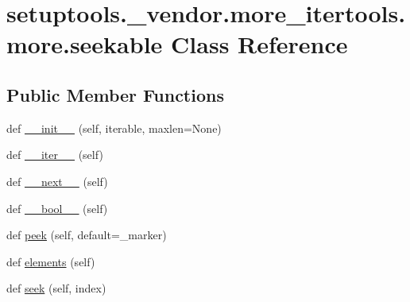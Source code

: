 \hypertarget{classsetuptools_1_1__vendor_1_1more__itertools_1_1more_1_1seekable}{}\section{setuptools.\+\_\+vendor.\+more\+\_\+itertools.\+more.\+seekable Class Reference}
\label{classsetuptools_1_1__vendor_1_1more__itertools_1_1more_1_1seekable}
\subsection*{Public Member Functions}
\begin{DoxyCompactItemize}
\item 
def \hyperlink{classsetuptools_1_1__vendor_1_1more__itertools_1_1more_1_1seekable_abe017ef9bd88e5de23195e5c0e51fa14}{\+\_\+\+\_\+init\+\_\+\+\_\+} (self, iterable, maxlen=None)
\item 
def \hyperlink{classsetuptools_1_1__vendor_1_1more__itertools_1_1more_1_1seekable_a227f61eed2b28e847403d1c2a9af1f78}{\+\_\+\+\_\+iter\+\_\+\+\_\+} (self)
\item 
def \hyperlink{classsetuptools_1_1__vendor_1_1more__itertools_1_1more_1_1seekable_a5f2cfdb66a5f2e2d3ca0a1d7a0ae81d6}{\+\_\+\+\_\+next\+\_\+\+\_\+} (self)
\item 
def \hyperlink{classsetuptools_1_1__vendor_1_1more__itertools_1_1more_1_1seekable_a894e14e591ed2fef1251a730d2d447d8}{\+\_\+\+\_\+bool\+\_\+\+\_\+} (self)
\item 
def \hyperlink{classsetuptools_1_1__vendor_1_1more__itertools_1_1more_1_1seekable_ad9a0b9728a6a89c7dbc1e19a97b726f4}{peek} (self, default=\+\_\+marker)
\item 
def \hyperlink{classsetuptools_1_1__vendor_1_1more__itertools_1_1more_1_1seekable_a20d75d4e10928108f295fdb5520bdf43}{elements} (self)
\item 
def \hyperlink{classsetuptools_1_1__vendor_1_1more__itertools_1_1more_1_1seekable_a0ee3ec0cd776f2589ff9851a5a06655b}{seek} (self, index)
\end{DoxyCompactItemize}


